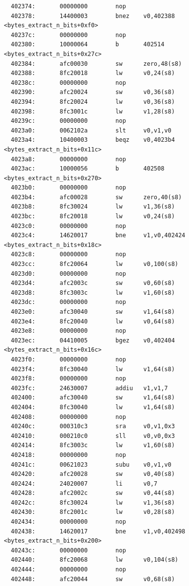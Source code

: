 \documentclass[11pt]{article}
\begin{document}
\begin{verbatim}
  402374:       00000000        nop
  402378:       14400003        bnez    v0,402388 <bytes_extract_n_bits+0xf0>
  40237c:       00000000        nop
  402380:       10000064        b       402514 <bytes_extract_n_bits+0x27c>
  402384:       afc00030        sw      zero,48(s8)
  402388:       8fc20018        lw      v0,24(s8)
  40238c:       00000000        nop
  402390:       afc20024        sw      v0,36(s8)
  402394:       8fc20024        lw      v0,36(s8)
  402398:       8fc3001c        lw      v1,28(s8)
  40239c:       00000000        nop
  4023a0:       0062102a        slt     v0,v1,v0
  4023a4:       10400003        beqz    v0,4023b4 <bytes_extract_n_bits+0x11c>
  4023a8:       00000000        nop
  4023ac:       10000056        b       402508 <bytes_extract_n_bits+0x270>
  4023b0:       00000000        nop
  4023b4:       afc00028        sw      zero,40(s8)
  4023b8:       8fc30024        lw      v1,36(s8)
  4023bc:       8fc20018        lw      v0,24(s8)
  4023c0:       00000000        nop
  4023c4:       14620017        bne     v1,v0,402424 <bytes_extract_n_bits+0x18c>
  4023c8:       00000000        nop
  4023cc:       8fc20064        lw      v0,100(s8)
  4023d0:       00000000        nop
  4023d4:       afc2003c        sw      v0,60(s8)
  4023d8:       8fc3003c        lw      v1,60(s8)
  4023dc:       00000000        nop
  4023e0:       afc30040        sw      v1,64(s8)
  4023e4:       8fc20040        lw      v0,64(s8)
  4023e8:       00000000        nop
  4023ec:       04410005        bgez    v0,402404 <bytes_extract_n_bits+0x16c>
  4023f0:       00000000        nop
  4023f4:       8fc30040        lw      v1,64(s8)
  4023f8:       00000000        nop
  4023fc:       24630007        addiu   v1,v1,7
  402400:       afc30040        sw      v1,64(s8)
  402404:       8fc30040        lw      v1,64(s8)
  402408:       00000000        nop
  40240c:       000310c3        sra     v0,v1,0x3
  402410:       000210c0        sll     v0,v0,0x3
  402414:       8fc3003c        lw      v1,60(s8)
  402418:       00000000        nop
  40241c:       00621023        subu    v0,v1,v0
  402420:       afc20028        sw      v0,40(s8)
  402424:       24020007        li      v0,7
  402428:       afc2002c        sw      v0,44(s8)
  40242c:       8fc30024        lw      v1,36(s8)
  402430:       8fc2001c        lw      v0,28(s8)
  402434:       00000000        nop
  402438:       14620017        bne     v1,v0,402498 <bytes_extract_n_bits+0x200>
  40243c:       00000000        nop
  402440:       8fc20068        lw      v0,104(s8)
  402444:       00000000        nop
  402448:       afc20044        sw      v0,68(s8)

\end{verbatim}
\end{document}
